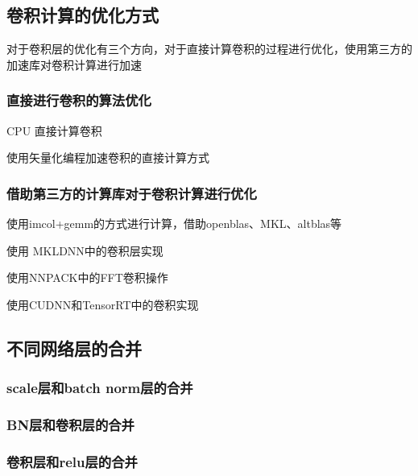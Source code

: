 \subsection{卷积计算的优化方式}
对于卷积层的优化有三个方向，对于直接计算卷积的过程进行优化，使用第三方的加速库对卷积计算进行加速
\subsubsection{直接进行卷积的算法优化}
CPU 直接计算卷积

使用矢量化编程加速卷积的直接计算方式

\subsubsection{借助第三方的计算库对于卷积计算进行优化}
使用imcol+gemm的方式进行计算，借助openblas、MKL、altblas等

使用 MKLDNN中的卷积层实现

使用NNPACK中的FFT卷积操作

使用CUDNN和TensorRT中的卷积实现

\subsection{不同网络层的合并}
\subsubsection{scale层和batch norm层的合并}

\subsubsection{BN层和卷积层的合并}

\subsubsection{卷积层和relu层的合并}






